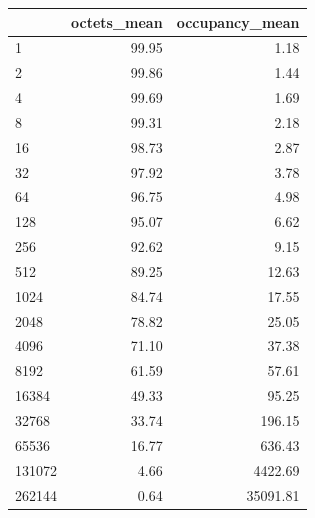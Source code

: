 \begin{tabular}{lrr}
\toprule
 & octets_mean & occupancy_mean \\
\midrule
1 & 99.95 & 1.18 \\
2 & 99.86 & 1.44 \\
4 & 99.69 & 1.69 \\
8 & 99.31 & 2.18 \\
16 & 98.73 & 2.87 \\
32 & 97.92 & 3.78 \\
64 & 96.75 & 4.98 \\
128 & 95.07 & 6.62 \\
256 & 92.62 & 9.15 \\
512 & 89.25 & 12.63 \\
1024 & 84.74 & 17.55 \\
2048 & 78.82 & 25.05 \\
4096 & 71.10 & 37.38 \\
8192 & 61.59 & 57.61 \\
16384 & 49.33 & 95.25 \\
32768 & 33.74 & 196.15 \\
65536 & 16.77 & 636.43 \\
131072 & 4.66 & 4422.69 \\
262144 & 0.64 & 35091.81 \\
\bottomrule
\end{tabular}
